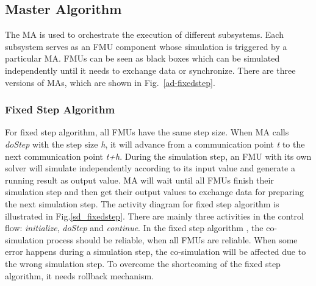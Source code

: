 \subsection{Master Algorithm}
The MA is used to orchestrate the execution of different subsystems. Each subsystem serves as an FMU component whose simulation is triggered by a particular MA. FMUs can be seen as black boxes which can be simulated independently until it needs to exchange data or synchronize. There are three versions of MAs, which are shown in Fig.~\ref{ad-fixedstep}.
\begin{figure}[htbp]
\end{figure}
\subsubsection{Fixed Step Algorithm}
For fixed step algorithm, all FMUs have the same step size. When MA calls \emph{doStep} with the step size \emph{h}, it will advance from a communication point \emph{t} to the next communication point \emph{t+h}. During the simulation step, an FMU with its own solver will simulate independently according to its input value and generate a running result as output value. MA will wait until all FMUs finish their simulation step and then get their output values to exchange data for preparing the next simulation step. The activity diagram for fixed step algorithm is illustrated in Fig.\ref{sd_fixedstep}. There are mainly three activities in the control flow: \emph{initialize}, \emph{doStep} and \emph{continue}. In the fixed step algorithm \cite{BromanBGLMTW13}, the co-simulation process should be reliable, when all FMUs are reliable. When some error happens during a simulation step, the co-simulation will be affected due to the wrong simulation step. To overcome the shortcoming of the fixed step algorithm, it needs rollback mechanism.
